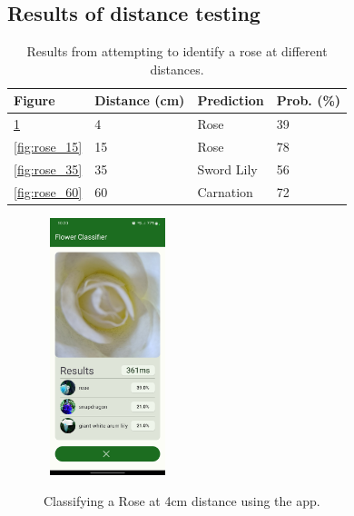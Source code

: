 \documentclass[12pt,a4paper]{report}
\begin{document}
\clearpage


\subsection{Results of distance testing}
\label{subsec:distance}

\begin{table}[h!]
    \begin{tabular}{ |l|l|l|l| }
        \hline
        Figure & Distance (cm) & Prediction & Prob. (\%)\\
        \hline
        \ref{fig:rose_4} & 4 & Rose & 39 \\
        \hline
        \ref{fig:rose_15} & 15 & Rose & 78 \\
        \hline
        \ref{fig:rose_35} & 35 & Sword Lily & 56 \\
        \hline
        \ref{fig:rose_60} & 60 & Carnation & 72 \\ 
        \hline
    \end{tabular}
    \caption{Results from attempting to identify a rose at different distances.}
    \label{table:distance}
\end{table}

\begin{figure}[h]\
    \includegraphics[width=0.3\textwidth]{rose_4cm.jpg}
    \caption{Classifying a Rose at 4cm distance using the app.}
    \label{fig:rose_4}
\end{figure}
\end{document}
